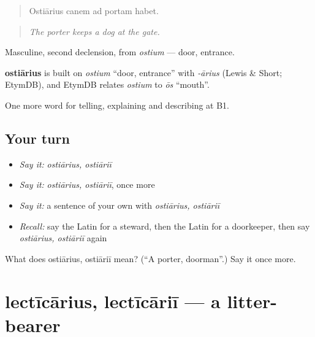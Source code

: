 \begin{quote}
Ostiārius canem ad portam habet.
\end{quote}

\begin{quote}
\emph{The porter keeps a dog at the gate.}
\end{quote}

Masculine, second declension, from \emph{ostium} — door, entrance.

\begin{cousinweb}
\textbf{ostiārius} is built on \emph{ostium} \textquotedblleft{}door, entrance\textquotedblright{} with \emph{-ārius} (Lewis \& Short; EtymDB), and EtymDB relates \emph{ostium} to \emph{ōs} \textquotedblleft{}mouth\textquotedblright{}.
\end{cousinweb}

\begin{grammarlens}[title={What you've built}]
One more word for telling, explaining and describing at B1.
\end{grammarlens}

\subsection*{Your turn}
\begin{itemize}
\raggedright
  \item \emph{Say it:} \emph{ostiārius, ostiāriī}
  \item \emph{Say it:} \emph{ostiārius, ostiāriī}, once more
  \item \emph{Say it:} a sentence of your own with \emph{ostiārius, ostiāriī}
  \item \emph{Recall:} say the Latin for a steward, then the Latin for a doorkeeper, then say \emph{ostiārius, ostiāriī} again
\end{itemize}

\begin{tcolorbox}[breakable,colback=teal!4,colframe=teal!35!black,title={Before you move on}]
What does ostiārius, ostiāriī mean? (\textquotedblleft{}A porter, doorman\textquotedblright{}.) Say it once more.
\end{tcolorbox}
\section[lectīcārius, lectīcāriī]{lectīcārius, lectīcāriī — a litter-bearer}

\label{lesson:LA-C531-lecticarius}



